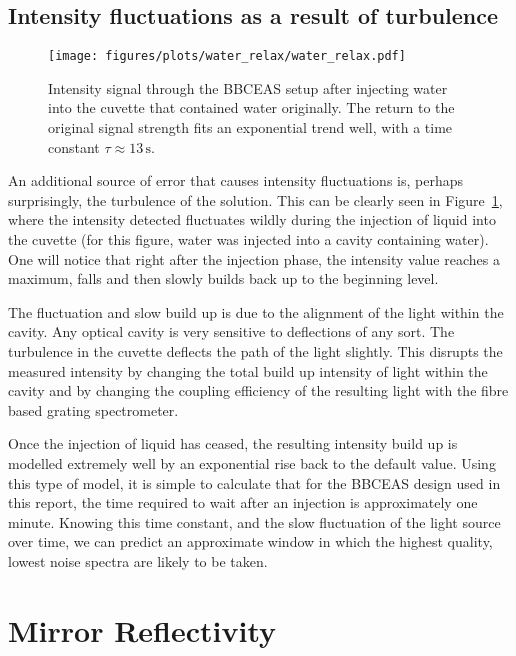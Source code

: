 \subsection{Intensity fluctuations as a result of turbulence}

\begin{figure}
\begin{center}
\texttt{[image: figures/plots/water\_relax/water\_relax.pdf]}
\end{center}
\caption[Intensity during Turbulence Fluid Injection]{Intensity signal through the \ac{BBCEAS} setup after injecting water into the cuvette that contained water originally. The return to the original signal strength fits an exponential trend well, with a time constant $\tau \approx 13\,\text{s}$.}
\label{fig:relax}
\end{figure}

An additional source of error that causes intensity fluctuations is, perhaps
surprisingly, the turbulence of the solution. This can be clearly seen in
Figure~\ref{fig:relax}, where the intensity detected fluctuates wildly during
the injection of liquid into the cuvette (for this figure, water was injected
into a cavity containing water). One will notice that right after the injection
phase, the intensity value reaches a maximum, falls and then slowly builds back
up to the beginning level.

The fluctuation and slow build up is due to the alignment of the light within
the cavity. Any optical cavity is very sensitive to deflections of any sort.
The turbulence in the cuvette deflects the path of the light slightly.
This disrupts the measured intensity by changing the total build up intensity
of light within the cavity and by changing the coupling efficiency of the
resulting light with the fibre based grating spectrometer.

Once the injection of liquid has ceased, the resulting intensity build
up is modelled extremely well by an exponential rise back to the default
value. Using this type of model, it is simple to calculate that for the
\ac{BBCEAS} design used in this report, the time required to wait after an
injection is approximately one minute.
Knowing this time constant, and the slow fluctuation of the light source over
time, we can predict an approximate window in which the highest quality,
lowest noise spectra are likely to be taken.

\section{Mirror Reflectivity}\label{sec:mirror_considerations}

